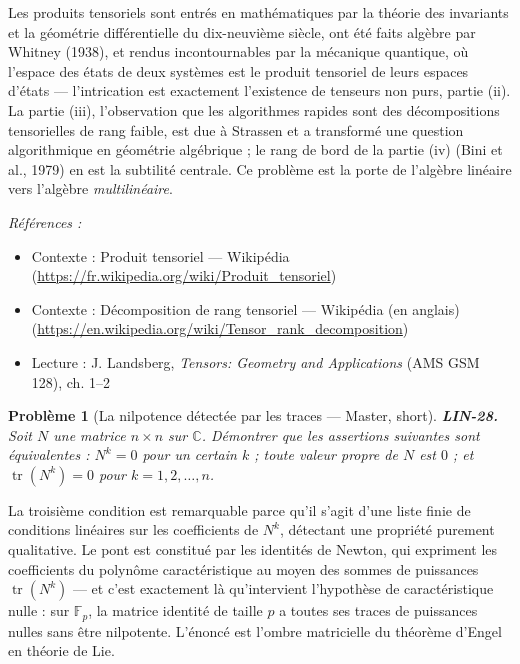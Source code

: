 \documentclass[11pt]{article}
\newtheorem{problem}{Problème}
\newenvironment{refs}{\par\small\noindent\emph{Références :}\begin{itemize}\setlength\itemsep{0pt}}{\end{itemize}\normalsize}
\begin{document}
\noindent Les produits tensoriels sont entrés en mathématiques par la théorie des invariants
et la géométrie différentielle du dix-neuvième siècle, ont été faits algèbre par Whitney (1938), et
rendus incontournables par la mécanique quantique, où l'espace des états de deux systèmes est le
produit tensoriel de leurs espaces d'états --- l'intrication est exactement l'existence de tenseurs non
purs, partie (ii). La partie (iii), l'observation que les algorithmes rapides sont des décompositions
tensorielles de rang faible, est due à Strassen et a transformé une question algorithmique en
géométrie algébrique ; le rang de bord de la partie (iv) (Bini et al., 1979) en est la subtilité
centrale. Ce problème est la porte de l'algèbre linéaire vers l'algèbre \textit{multilinéaire}.

\begin{refs}
\item Contexte : Produit tensoriel --- Wikipédia (\url{https://fr.wikipedia.org/wiki/Produit_tensoriel})
\item Contexte : Décomposition de rang tensoriel --- Wikipédia (en anglais) (\url{https://en.wikipedia.org/wiki/Tensor_rank_decomposition})
\item Lecture : J. Landsberg, \textit{Tensors: Geometry and Applications} (AMS GSM 128), ch. 1--2
\end{refs}

\bigskip

\begin{problem}[{La nilpotence détectée par les traces --- Master, short}]
\textbf{LIN-28.} Soit $N$ une matrice $n \times n$ sur $\mathbb{C}$.
Démontrer que les assertions suivantes sont équivalentes : $N^k = 0$ pour un certain $k$ ; toute
valeur propre de $N$ est $0$ ; et $\operatorname{tr}(N^k) = 0$ pour $k = 1, 2, \dots, n$.
\end{problem}

\noindent La troisième condition est remarquable parce qu'il s'agit d'une liste finie de
conditions linéaires sur les coefficients de $N^k$, détectant une propriété purement qualitative. Le
pont est constitué par les identités de Newton, qui expriment les coefficients du polynôme
caractéristique au moyen des sommes de puissances $\operatorname{tr}(N^k)$ --- et c'est exactement là
qu'intervient l'hypothèse de caractéristique nulle : sur $\mathbb{F}_p$, la matrice identité de
taille $p$ a toutes ses traces de puissances nulles sans être nilpotente. L'énoncé est l'ombre
matricielle du théorème d'Engel en théorie de Lie.
\end{document}
